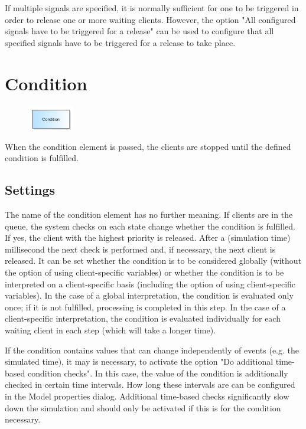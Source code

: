 If multiple signals are specified, it is normally sufficient for one to be triggered in order
to release one or more waiting clients. However, the option
"All configured signals have to be triggered for a release" can be used to configure that
all specified signals have to be triggered for a release to take place.


\section{Condition}
\label{ref:ModelElementHold}

\begin{figure}
\vspace{-22pt}
\includegraphics[width=2cm]{imageModelElementHold.png}
\vspace{-22pt}
\end{figure}

When the condition element is passed, the clients are stopped until the defined condition is fulfilled. 

\subsection*{Settings}

The name of the condition element has no further meaning.
If clients are in the queue, the system checks on each state change whether the condition is fulfilled.
If yes, the client with the highest priority is released. After a (simulation time) millisecond the next check
is performed and, if necessary, the next client is released.
It can be set whether the condition is to be considered globally (without the option of using client-specific variables)
or whether the condition is to be interpreted on a client-specific basis (including the option of using client-specific variables).
In the case of a global interpretation, the condition is evaluated only once; if it is not fulfilled, processing is completed in this step.
In the case of a client-specific interpretation, the condition is evaluated individually for each waiting client in each step (which will take a longer time).

If the condition contains values that can change independently of events (e.g. the simulated time),
it may is necessary, to activate the option "Do additional time-based condition checks". In this case,
the value of the condition is additionally checked in certain time intervals. How long these intervals
are can be configured in the Model properties dialog.
Additional time-based checks significantly slow down the simulation and should only be activated
if this is for the condition necessary.

